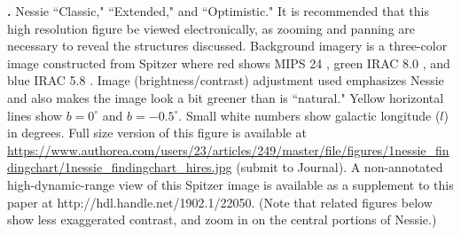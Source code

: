 \textbf{\label{fig:FindingChart}.} Nessie ``Classic," ``Extended," and ``Optimistic."  It is recommended that this high resolution figure be viewed electronically, as zooming and panning are necessary to reveal the structures discussed.   Background imagery is a three-color image constructed from Spitzer where red shows MIPS 24 \micron, green IRAC 8.0 \micron, and blue IRAC 5.8 \micron. Image (brightness/contrast) adjustment used  emphasizes Nessie and also makes the image look a bit greener than is ``natural."  Yellow horizontal lines show $b=0^\circ$ and $b=-0.5^\circ$. Small white numbers show galactic longitude ($l$) in degrees. Full size version of this figure is available at \url{https://www.authorea.com/users/23/articles/249/master/file/figures/1nessie_findingchart/1nessie_findingchart_hires.jpg} (submit to Journal). A non-annotated high-dynamic-range view of this Spitzer image is available as a supplement to this paper at http://hdl.handle.net/1902.1/22050. (Note that related figures below show less exaggerated contrast, and zoom in on the central portions of Nessie.)